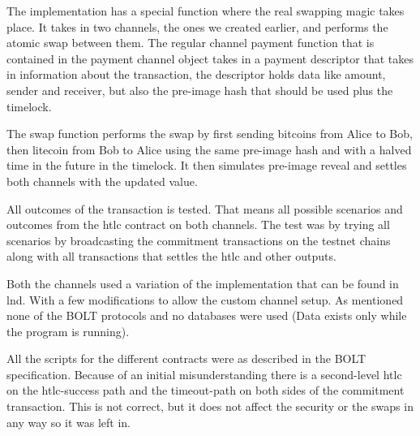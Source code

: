 The implementation has a special function where the real swapping magic takes place. 
It takes in two channels, the ones we created earlier, and performs the atomic swap between them.
The regular channel payment function that is contained in the payment channel object
takes in a payment descriptor that takes in information about the transaction, the 
descriptor holds data like amount, sender and receiver, but also the pre-image hash
that should be used plus the timelock.

The swap function performs the swap by first sending bitcoins from Alice to Bob, then litecoin 
from Bob to Alice using the same pre-image hash and with a halved time in the future in the timelock.
It then simulates pre-image reveal and settles both channels with the updated value.

All outcomes of the transaction is tested. That means all possible scenarios and outcomes from 
the htlc contract on both channels. The test was by trying all scenarios by broadcasting 
the commitment transactions on the testnet chains along with all transactions that settles the htlc
and other outputs. 

Both the channels used a variation of the implementation that can be found in lnd. With a few modifications
to allow the custom channel setup. As mentioned none of the BOLT protocols and no databases were used (Data exists only while the program is running). 

All the scripts for the different contracts were as described in the BOLT specification. 
Because of an initial misunderstanding there is a second-level htlc on the htlc-success path
and the timeout-path on both sides of the commitment transaction. This is not correct, but it
does not affect the security or the swaps in any way so it was left in.